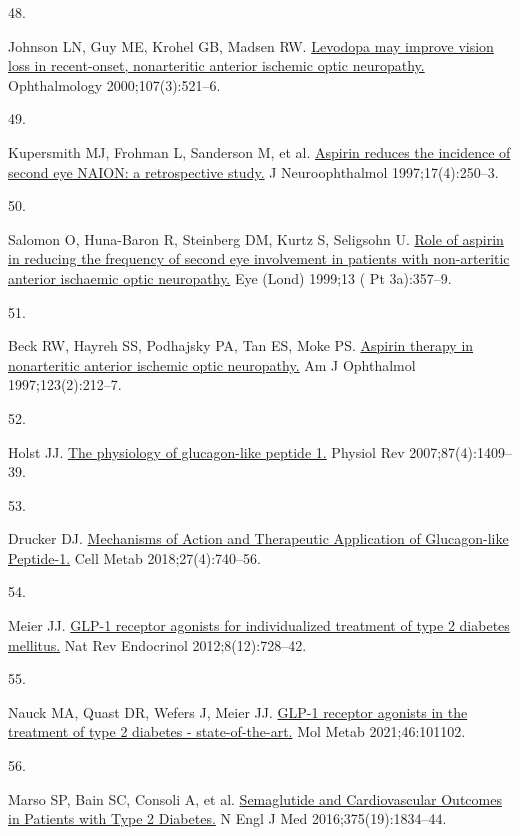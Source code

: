 \documentclass[
  11pt,
]{article}
\newlength{\cslhangindent}
\newlength{\csllabelwidth}
\newenvironment{CSLReferences}[2] %
 {\begin{list}{}{%
  \setlength{\itemindent}{0pt}
  \setlength{\leftmargin}{0pt}
  \setlength{\parsep}{0pt}
  \ifodd #1
   \setlength{\leftmargin}{\cslhangindent}
   \setlength{\itemindent}{-1\cslhangindent}
  \fi
  \setlength{\itemsep}{#2\baselineskip}}}
 {\end{list}}
\newcommand{\CSLLeftMargin}[1]{\parbox[t]{\csllabelwidth}{\strut#1\strut}}
\newcommand{\CSLRightInline}[1]{\parbox[t]{\linewidth - \csllabelwidth}{\strut#1\strut}}
\begin{document}
\begin{CSLReferences}{0}{1}
\CSLLeftMargin{48. }%
\CSLRightInline{Johnson LN, Guy ME, Krohel GB, Madsen RW.
\href{https://doi.org/10.1016/s0161-6420(99)00133-5}{{Levodopa may
improve vision loss in recent-onset, nonarteritic anterior ischemic
optic neuropathy.}} Ophthalmology 2000;107(3):521--6. }

\CSLLeftMargin{49. }%
\CSLRightInline{Kupersmith MJ, Frohman L, Sanderson M, et al.
\href{}{{Aspirin reduces the incidence of second eye NAION: a
retrospective study.}} J Neuroophthalmol 1997;17(4):250--3. }

\CSLLeftMargin{50. }%
\CSLRightInline{Salomon O, Huna-Baron R, Steinberg DM, Kurtz S,
Seligsohn U. \href{https://doi.org/10.1038/eye.1999.90}{{Role of aspirin
in reducing the frequency of second eye involvement in patients with
non-arteritic anterior ischaemic optic neuropathy.}} Eye (Lond) 1999;13
( Pt 3a):357--9. }

\CSLLeftMargin{51. }%
\CSLRightInline{Beck RW, Hayreh SS, Podhajsky PA, Tan ES, Moke PS.
\href{https://doi.org/10.1016/s0002-9394(14)71038-4}{{Aspirin therapy in
nonarteritic anterior ischemic optic neuropathy.}} Am J Ophthalmol
1997;123(2):212--7. }

\CSLLeftMargin{52. }%
\CSLRightInline{Holst JJ.
\href{https://doi.org/10.1152/physrev.00034.2006}{{The physiology of
glucagon-like peptide 1.}} Physiol Rev 2007;87(4):1409--39. }

\CSLLeftMargin{53. }%
\CSLRightInline{Drucker DJ.
\href{https://doi.org/10.1016/j.cmet.2018.03.001}{{Mechanisms of Action
and Therapeutic Application of Glucagon-like Peptide-1.}} Cell Metab
2018;27(4):740--56. }

\CSLLeftMargin{54. }%
\CSLRightInline{Meier JJ.
\href{https://doi.org/10.1038/nrendo.2012.140}{{GLP-1 receptor agonists
for individualized treatment of type 2 diabetes mellitus.}} Nat Rev
Endocrinol 2012;8(12):728--42. }

\CSLLeftMargin{55. }%
\CSLRightInline{Nauck MA, Quast DR, Wefers J, Meier JJ.
\href{https://doi.org/10.1016/j.molmet.2020.101102}{{GLP-1 receptor
agonists in the treatment of type 2 diabetes - state-of-the-art.}} Mol
Metab 2021;46:101102. }

\CSLLeftMargin{56. }%
\CSLRightInline{Marso SP, Bain SC, Consoli A, et al.
\href{https://doi.org/10.1056/NEJMoa1607141}{{Semaglutide and
Cardiovascular Outcomes in Patients with Type 2 Diabetes.}} N Engl J Med
2016;375(19):1834--44. }


\end{CSLReferences}
\end{document}
